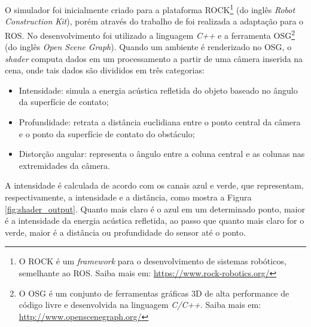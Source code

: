 O simulador foi inicialmente criado para a plataforma ROCK\footnote{O ROCK é um \textit{framework} para o desenvolvimento de sistemas robóticos, semelhante ao ROS. Saiba mais em: \url{https://www.rock-robotics.org/}} (do inglês \textit{Robot Construction Kit}), porém através do trabalho de \cite{longaray2017} foi realizada a adaptação para o ROS.
No desenvolvimento foi utilizado a linguagem \textit{C++} e a ferramenta OSG\footnote{O OSG é um conjunto de ferramentas gráficas 3D de alta performance de código livre e desenvolvida na linguagem \textit{C/C++}. Saiba mais em: \url{http://www.openscenegraph.org/}} (do inglês \textit{Open Scene Graph}).
Quando um ambiente é renderizado no OSG, o \textit{shader} computa dados em um processamento a partir de uma câmera inserida na cena, onde tais dados são divididos em três categorias: 

\begin{itemize}
    \item Intensidade: simula a energia acústica refletida do objeto baseado no ângulo da superfície de contato;
    \item Profundidade: retrata a distância euclidiana entre o ponto central da câmera e o ponto da superfície de contato do obstáculo;
    \item Distorção angular: representa o ângulo entre a coluna central e as colunas nas extremidades da câmera.
\end{itemize}

A intensidade é calculada de acordo com os canais azul e verde, que representam, respectivamente, a intensidade e a distância, como mostra a Figura \ref{fig:shader_output}. Quanto mais claro é o azul em um determinado ponto, maior é a intensidade da energia acústica refletida, ao passo que quanto mais claro for o verde, maior é a distância ou profundidade do sensor até o ponto.

